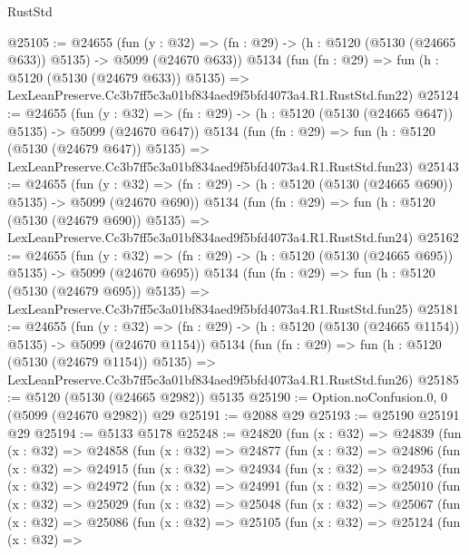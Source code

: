 \begin{lexlean}{RustStd}
\begin{coremodule}
@25105 := @24655
    (fun (y : @32) => (fn : @29) -> (h : @5120 (@5130 (@24665 @633)) @5135) -> @5099 (@24670 @633))
    @5134
    (fun (fn : @29) =>
    fun (h : @5120 (@5130 (@24679 @633)) @5135) =>
    LexLeanPreserve.Cc3b7ff5c3a01bf834aed9f5bfd4073a4.R1.RustStd.fun22)
@25124 := @24655
    (fun (y : @32) => (fn : @29) -> (h : @5120 (@5130 (@24665 @647)) @5135) -> @5099 (@24670 @647))
    @5134
    (fun (fn : @29) =>
    fun (h : @5120 (@5130 (@24679 @647)) @5135) =>
    LexLeanPreserve.Cc3b7ff5c3a01bf834aed9f5bfd4073a4.R1.RustStd.fun23)
@25143 := @24655
    (fun (y : @32) => (fn : @29) -> (h : @5120 (@5130 (@24665 @690)) @5135) -> @5099 (@24670 @690))
    @5134
    (fun (fn : @29) =>
    fun (h : @5120 (@5130 (@24679 @690)) @5135) =>
    LexLeanPreserve.Cc3b7ff5c3a01bf834aed9f5bfd4073a4.R1.RustStd.fun24)
@25162 := @24655
    (fun (y : @32) => (fn : @29) -> (h : @5120 (@5130 (@24665 @695)) @5135) -> @5099 (@24670 @695))
    @5134
    (fun (fn : @29) =>
    fun (h : @5120 (@5130 (@24679 @695)) @5135) =>
    LexLeanPreserve.Cc3b7ff5c3a01bf834aed9f5bfd4073a4.R1.RustStd.fun25)
@25181 := @24655
    (fun (y : @32) =>
    (fn : @29) -> (h : @5120 (@5130 (@24665 @1154)) @5135) -> @5099 (@24670 @1154))
    @5134
    (fun (fn : @29) =>
    fun (h : @5120 (@5130 (@24679 @1154)) @5135) =>
    LexLeanPreserve.Cc3b7ff5c3a01bf834aed9f5bfd4073a4.R1.RustStd.fun26)
@25185 := @5120 (@5130 (@24665 @2982)) @5135
@25190 := Option.noConfusion.{0, 0} (@5099 (@24670 @2982)) @29
@25191 := @2088 @29
@25193 := @25190 @25191 @29
@25194 := @5133 @5178
@25248 := @24820
    (fun (x : @32) =>
    @24839
      (fun (x : @32) =>
      @24858
        (fun (x : @32) =>
        @24877
          (fun (x : @32) =>
          @24896
            (fun (x : @32) =>
            @24915
              (fun (x : @32) =>
              @24934
                (fun (x : @32) =>
                @24953
                  (fun (x : @32) =>
                  @24972
                    (fun (x : @32) =>
                    @24991
                      (fun (x : @32) =>
                      @25010
                        (fun (x : @32) =>
                        @25029
                          (fun (x : @32) =>
                          @25048
                            (fun (x : @32) =>
                            @25067
                              (fun (x : @32) =>
                              @25086
                                (fun (x : @32) =>
                                @25105
                                  (fun (x : @32) =>
                                  @25124
                                    (fun (x : @32) =>

\end{coremodule}
\end{lexlean}
